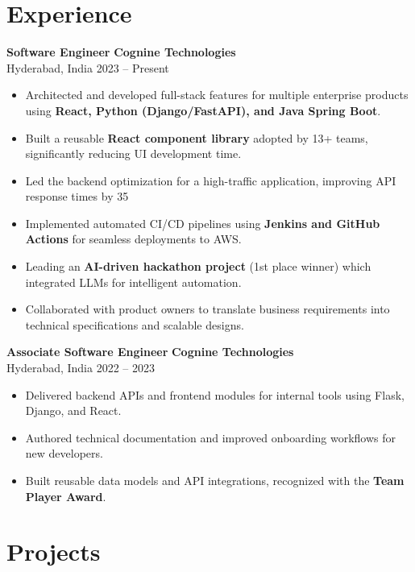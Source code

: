 \documentclass[11pt]{article}
\begin{document}
\section*{Experience}

\textbf{Software Engineer} \hfill \textbf{Cognine Technologies} \\
Hyderabad, India \hfill 2023 -- Present
\begin{itemize}
    \item Architected and developed full-stack features for multiple enterprise products using \textbf{React, Python (Django/FastAPI), and Java Spring Boot}.
    \item Built a reusable \textbf{React component library} adopted by 13+ teams, significantly reducing UI development time.
    \item Led the backend optimization for a high-traffic application, improving API response times by 35%
    \item Implemented automated CI/CD pipelines using \textbf{Jenkins and GitHub Actions} for seamless deployments to AWS.
    \item Leading an \textbf{AI-driven hackathon project} (1st place winner) which integrated LLMs for intelligent automation.
    \item Collaborated with product owners to translate business requirements into technical specifications and scalable designs.
\end{itemize}

\textbf{Associate Software Engineer} \hfill \textbf{Cognine Technologies} \\
Hyderabad, India \hfill 2022 -- 2023
\begin{itemize}
    \item Delivered backend APIs and frontend modules for internal tools using Flask, Django, and React.
    \item Authored technical documentation and improved onboarding workflows for new developers.
    \item Built reusable data models and API integrations, recognized with the \textbf{Team Player Award}.
\end{itemize}

\section*{Projects}
\end{document}
